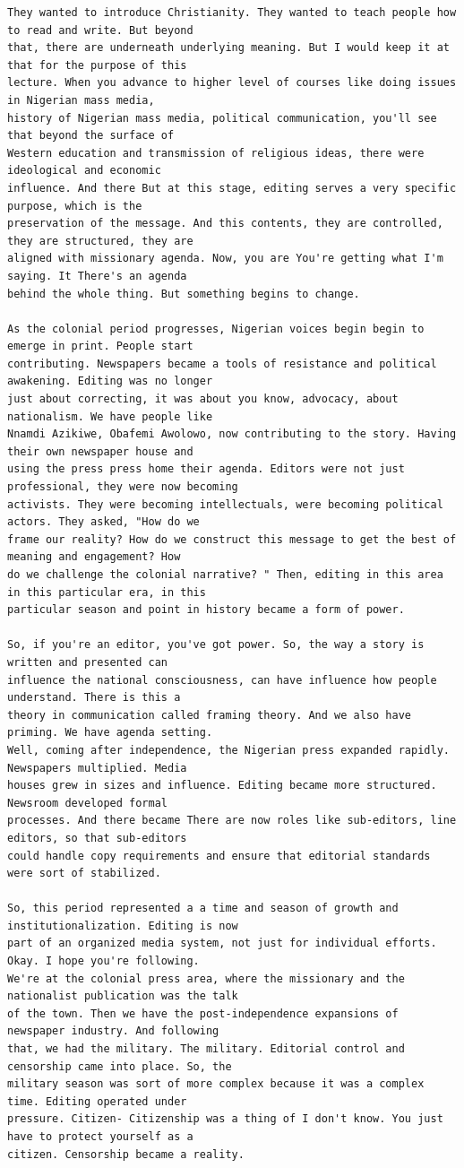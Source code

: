 {\begin{Verbatim}
They wanted to introduce Christianity. They wanted to teach people how to read and write. But beyond
that, there are underneath underlying meaning. But I would keep it at that for the purpose of this
lecture. When you advance to higher level of courses like doing issues in Nigerian mass media,
history of Nigerian mass media, political communication, you'll see that beyond the surface of
Western education and transmission of religious ideas, there were ideological and economic
influence. And there But at this stage, editing serves a very specific purpose, which is the
preservation of the message. And this contents, they are controlled, they are structured, they are
aligned with missionary agenda. Now, you are You're getting what I'm saying. It There's an agenda
behind the whole thing. But something begins to change.

As the colonial period progresses, Nigerian voices begin begin to emerge in print. People start
contributing. Newspapers became a tools of resistance and political awakening. Editing was no longer
just about correcting, it was about you know, advocacy, about nationalism. We have people like
Nnamdi Azikiwe, Obafemi Awolowo, now contributing to the story. Having their own newspaper house and
using the press press home their agenda. Editors were not just professional, they were now becoming
activists. They were becoming intellectuals, were becoming political actors. They asked, "How do we
frame our reality? How do we construct this message to get the best of meaning and engagement? How
do we challenge the colonial narrative? " Then, editing in this area in this particular era, in this
particular season and point in history became a form of power.

So, if you're an editor, you've got power. So, the way a story is written and presented can
influence the national consciousness, can have influence how people understand. There is this a
theory in communication called framing theory. And we also have priming. We have agenda setting.
Well, coming after independence, the Nigerian press expanded rapidly. Newspapers multiplied. Media
houses grew in sizes and influence. Editing became more structured. Newsroom developed formal
processes. And there became There are now roles like sub-editors, line editors, so that sub-editors
could handle copy requirements and ensure that editorial standards were sort of stabilized.

So, this period represented a a time and season of growth and institutionalization. Editing is now
part of an organized media system, not just for individual efforts. Okay. I hope you're following.
We're at the colonial press area, where the missionary and the nationalist publication was the talk
of the town. Then we have the post-independence expansions of newspaper industry. And following
that, we had the military. The military. Editorial control and censorship came into place. So, the
military season was sort of more complex because it was a complex time. Editing operated under
pressure. Citizen- Citizenship was a thing of I don't know. You just have to protect yourself as a
citizen. Censorship became a reality.


\end{Verbatim}}
